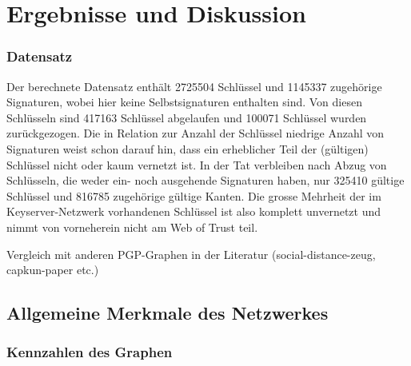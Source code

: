 
\chapter{Ergebnisse und Diskussion}
\label{ch:Ergebnisse}

\subsection{Datensatz}
\label{sec:datensatz}

Der berechnete Datensatz enth\"alt 2725504 Schl\"ussel und 1145337
zugeh\"orige Signaturen, wobei hier keine Selbstsignaturen enthalten
sind. Von diesen Schl\"usseln sind 417163 Schl\"ussel abgelaufen und
100071 Schl\"ussel wurden zur\"uckgezogen. Die in Relation zur Anzahl
der Schl\"ussel niedrige Anzahl von Signaturen weist schon darauf hin,
dass ein erheblicher Teil der (g\"ultigen) Schl\"ussel nicht oder kaum
vernetzt ist. In der Tat verbleiben nach Abzug von Schl\"usseln, die
weder ein- noch ausgehende Signaturen haben, nur 325410 g\"ultige
Schl\"ussel und 816785 zugeh\"orige g\"ultige Kanten. Die grosse
Mehrheit der im Keyserver-Netzwerk vorhandenen Schl\"ussel ist also
komplett unvernetzt und nimmt von vorneherein nicht am Web of Trust teil.

Vergleich mit anderen PGP-Graphen in der Literatur
(social-distance-zeug, capkun-paper etc.)

\section{Allgemeine Merkmale des Netzwerkes}
\label{sec:result-allg-merkm-des}


\subsection{Kennzahlen des Graphen}
\label{sec:kennz-des-graph}

